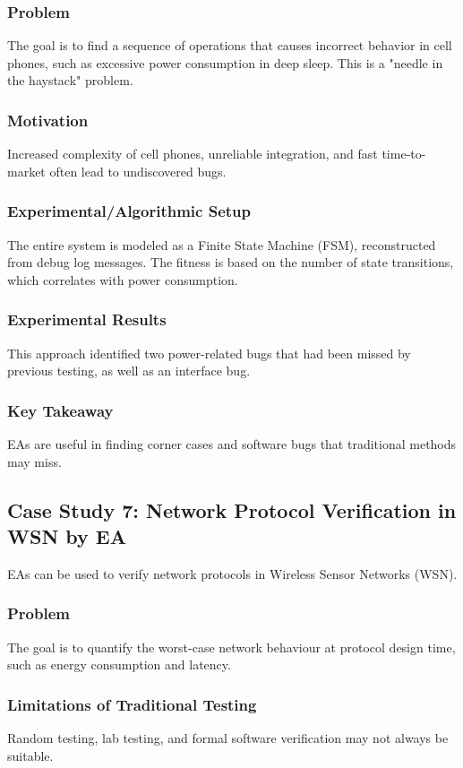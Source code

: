 \subsubsection*{Problem}
The goal is to find a sequence of operations that causes incorrect behavior in cell phones, such as excessive power consumption in deep sleep. This is a "needle in the haystack" problem.
\subsubsection*{Motivation}
Increased complexity of cell phones, unreliable integration, and fast time-to-market often lead to undiscovered bugs.
\subsubsection*{Experimental/Algorithmic Setup}
The entire system is modeled as a Finite State Machine (FSM), reconstructed from debug log messages. The fitness is based on the number of state transitions, which correlates with power consumption.
\subsubsection*{Experimental Results}
This approach identified two power-related bugs that had been missed by previous testing, as well as an interface bug.
\subsubsection*{Key Takeaway}
EAs are useful in finding corner cases and software bugs that traditional methods may miss.

\subsection*{Case Study 7: Network Protocol Verification in WSN by EA}
EAs can be used to verify network protocols in Wireless Sensor Networks (WSN).
\subsubsection*{Problem}
The goal is to quantify the worst-case network behaviour at protocol design time, such as energy consumption and latency.
\subsubsection*{Limitations of Traditional Testing}
Random testing, lab testing, and formal software verification may not always be suitable.
